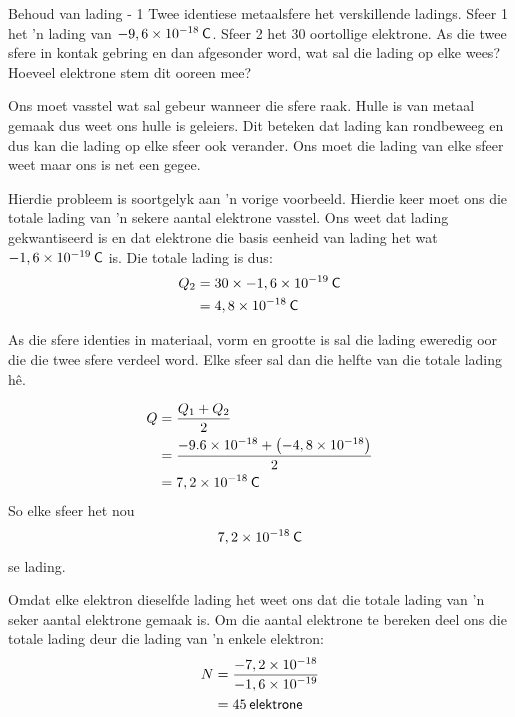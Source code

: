 \begin{wex}{Behoud van lading - 1}
{
Twee identiese metaalsfere het verskillende ladings. Sfeer 1 het 'n lading van $-9,6\ensuremath{\times}{10}^{-18}\phantom{\rule{2pt}{0ex}}\mathsf{C}$. Sfeer 2 het 30 oortollige elektrone. As die twee sfere in kontak gebring en dan afgesonder word, wat sal die lading op elke wees? Hoeveel elektrone stem dit ooreen mee?
}
{
Ons moet vasstel wat sal gebeur wanneer die sfere raak. Hulle is van metaal gemaak dus weet ons hulle is geleiers. Dit beteken dat lading kan rondbeweeg en dus kan die lading op elke sfeer ook verander. Ons moet die lading van elke sfeer weet maar ons is net een gegee.


Hierdie probleem is soortgelyk aan 'n vorige voorbeeld. Hierdie keer moet ons die totale lading van 'n sekere aantal elektrone vasstel. Ons weet dat lading gekwantiseerd is en dat elektrone die basis eenheid van lading het wat  $-1,6\ensuremath{\times}{10}^{-19}\phantom{\rule{2pt}{0ex}}\mathsf{C}$ is. Die totale lading is dus:
    \begin{align*}
    {Q}_{2}&=30\ensuremath{\times}-1,6\ensuremath{\times}{10}^{-19}\phantom{\rule{2pt}{0ex}}\mathsf{C}\\ 
\phantom{x}&=4,8\ensuremath{\times}{10}^{-18}\phantom{\rule{2pt}{0ex}}\mathsf{C}
      \end{align*}



As die sfere identies in materiaal, vorm en grootte is sal die lading eweredig oor die die twee sfere verdeel word. Elke sfeer sal dan die helfte van die totale lading h\^e. 
    
\begin{align*}
Q  &=\frac{{Q}_{1}+{Q}_{2}}{2}\\ \phantom{x}&=\frac{-9.6\ensuremath{\times}{10}^{-18}+\left(-4,8\ensuremath{\times}{10}^{-18}\right)}{2}\\ 
    &=7,2\ensuremath{\times}{10}^{-18}\phantom{\rule{2pt}{0ex}}\mathsf{C}
\end{align*}
 So elke sfeer het nou
\begin{equation*}
    7,2\ensuremath{\times}{10}^{-18}\phantom{\rule{2pt}{0ex}}\mathsf{C}
\end{equation*}
     se lading. \par


Omdat elke elektron dieselfde lading het weet ons dat die totale lading van 'n seker aantal elektrone gemaak is. Om die aantal elektrone te bereken deel ons die totale lading deur die lading van 'n enkele elektron:
\begin{align*}
     N &=\frac{-7,2\ensuremath{\times}{10}^{-18}}{-1,6\ensuremath{\times}{10}^{-19}}\\ 
\phantom{x}&=45\phantom{\rule{2pt}{0ex}}\mathsf{elektrone} 
    \end{align*}
}\end{wex}




